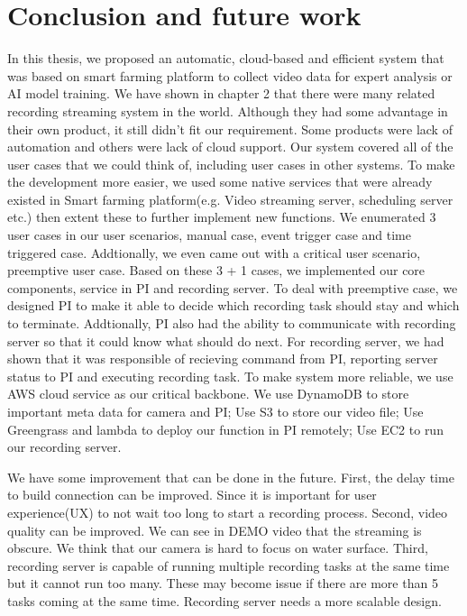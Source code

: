 \chapter{Conclusion and future work}
\label{c:conclusion}





\graphicspath{{./figsrc/}}
\fi

In this thesis, we proposed an automatic, cloud-based and efficient system that was based on smart farming platform to collect video data for expert analysis or AI model training. We have shown in chapter 2 that there were many related recording streaming system in the world. Although they had some advantage in their own product, it still didn't fit our requirement. Some products were lack of automation and others were lack of cloud support. Our system covered all of the user cases that we could think of, including user cases in other systems. To make the development more easier, we used some native services that were already existed in Smart farming platform(e.g. Video streaming server, scheduling server etc.) then extent these to further implement new functions. We enumerated 3 user cases in our user scenarios, manual case, event trigger case and time triggered case. Addtionally, we even came out with a critical user scenario, preemptive user case. Based on these 3 + 1 cases, we implemented our core components, service in PI and recording server. To deal with preemptive case, we designed PI to make it able to decide which recording task should stay and which to terminate. Addtionally, PI also had the ability to communicate with recording server so that it could know what should do next. For recording server, we had shown that it was responsible of recieving command from PI, reporting server status to PI and executing recording task. To make system more reliable, we use AWS cloud service as our critical backbone. We use DynamoDB to store important meta data for camera and PI; Use S3 to store our video file; Use Greengrass and lambda to deploy our function in PI remotely; Use EC2 to run our recording server.

We have some improvement that can be done in the future. First, the delay time to build connection can be improved. Since it is important for user experience(UX) to not wait too long to start a recording process. Second, video quality can be improved. We can see in DEMO video that the streaming is obscure. We think that our camera is hard to focus on water surface. Third, recording server is capable of running multiple recording tasks at the same time but it cannot run too many. These may become issue if there are more than 5 tasks coming at the same time. Recording server needs a more scalable design.

